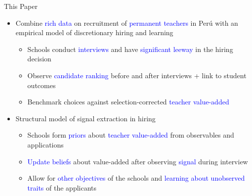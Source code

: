 \documentclass[compress,10pt,aspectratio=169]{beamer}
\newcommand\emphblue[1]{\textcolor{blue}{#1}}
\begin{document}
\begin{frame}{This Paper}
    \begin{itemize}
        \item Combine \emphblue{rich data} on recruitment of \emphblue{permanent teachers} in Per\'u with an empirical model of discretionary hiring and learning
        \begin{itemize}
        \smallskip
        \item[$\Rightarrow$] Schools conduct \emphblue{interviews} and have \emphblue{significant leeway} in the hiring decision
        \medskip
        \item[$\Rightarrow$] Observe \emphblue{candidate ranking} before and after interviews + link to student outcomes
        \medskip
        \item[$\Rightarrow$] Benchmark choices against selection-corrected \emphblue{teacher value-added}
        \end{itemize}
        \bigskip
        \item Structural model of signal extraction in hiring
        \begin{itemize}
        \smallskip
            \item[$\Rightarrow$] Schools form \emphblue{priors} about \emphblue{teacher value-added} from observables and applications
            \medskip
            \item[$\Rightarrow$] \emphblue{Update beliefs} about value-added after observing \emphblue{signal} during interview
            \medskip
            \item[$\Rightarrow$] Allow for \emphblue{other objectives} of the schools and \emphblue{learning about unobserved traits}  of the applicants
        \end{itemize}
    \end{itemize}
\end{frame}
\end{document}
